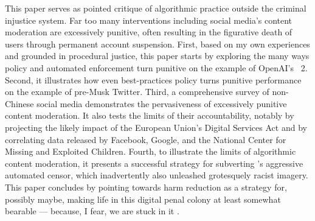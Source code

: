 This paper serves as pointed critique of algorithmic practice outside the
criminal injustice system. Far too many interventions including social media's
content moderation are excessively punitive, often resulting in the figurative
death of users through permanent account suspension. First, based on my own
experiences and grounded in procedural justice, this paper starts by exploring
the many ways policy and automated enforcement turn punitive on the example of
OpenAI's \DALLE\ 2. Second, it illustrates how even best-practices policy turns
punitive performance on the example of pre-Musk Twitter. Third, a comprehensive
survey of non-Chinese social media demonstrates the pervasiveness of excessively
punitive content moderation. It also tests the limits of their accountability,
notably by projecting the likely impact of the European Union's Digital Services
Act and by correlating data released by Facebook, Google, and the National
Center for Missing and Exploited Children. Fourth, to illustrate the limits of
algorithmic content moderation, it presents a successful strategy for subverting
\DALLE's aggressive automated censor, which inadvertently also unleashed
grotesquely racist imagery. This paper concludes by pointing towards harm
reduction as a strategy for, possibly maybe, making life in this digital penal
colony at least somewhat bearable --- because, I fear, we are stuck in it
.

